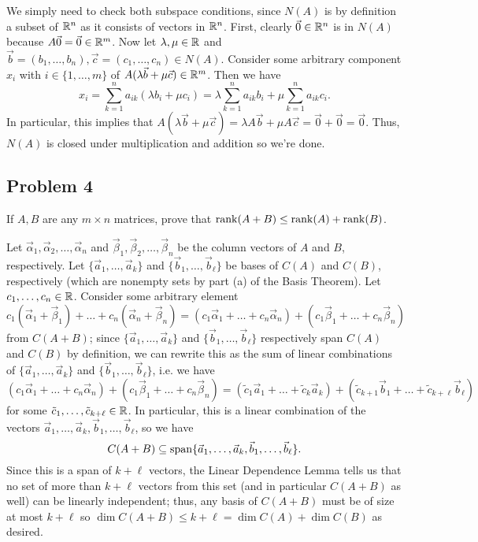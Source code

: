 \documentclass[main.tex]{subfiles}
\begin{document}
\begin{soln}
    We simply need to check both subspace conditions, since $N(A)$ is by definition a subset of $\mathbb R^n$ as it consists of vectors in $\mathbb R^n$. First, clearly $\vec{0}\in \mathbb R^n$ is in $N(A)$ because $A\vec{0} = \vec{0}\in \mathbb R^m$. Now let $\lambda, \mu\in \mathbb R$ and $\vec{b} = (b_1, \ldots , b_n), \vec{c} = (c_1, \ldots , c_n)\in N(A)$. Consider some arbitrary component $x_i$ with $i\in \{1, \ldots , m\}$ of $A(\lambda \vec{b} + \mu\vec{c})\in \mathbb R^m$. Then we have
    \[x_i = \sum_{k = 1}^n a_{ik}(\lambda b_i + \mu c_i) = \lambda\sum_{k = 1}^na_{ik}b_i + \mu\sum_{k = 1}^na_{ik}c_i.\]
    In particular, this implies that $A(\lambda \vec{b} + \mu\vec{c}) = \lambda A\vec{b} + \mu A\vec{c} = \vec{0} + \vec{0} = \vec{0}$. Thus, $N(A)$ is closed under multiplication and addition so we're done.
\end{soln}
\eject

\subsection{Problem 4}
\begin{claim}
    If $A, B$ are any $m \times n$ matrices, prove that $\operatorname{rank}(A + B) \le \operatorname{rank} (A) + \operatorname{rank} (B)$.
\end{claim}

\begin{soln}
    Let $\vec{\alpha}_1, \vec{\alpha}_2, \ldots , \vec{\alpha}_n$ and $\vec{\beta}_1, \vec{\beta}_2, \ldots , \vec{\beta}_n$ be the column vectors of $A$ and $B$, respectively. Let $\{\vec{a}_1, \ldots , \vec{a}_k\}$ and $\{\vec{b}_1, \ldots , \vec{b}_\ell\}$ be bases of $C(A)$ and $C(B)$, respectively (which are nonempty sets by part (a) of the Basis Theorem). Let $c_1, \ldots , c_n\in \mathbb R$. Consider some arbitrary element
    \[c_1(\vec{\alpha}_1 + \vec{\beta}_1) + \ldots + c_n(\vec{\alpha}_n + \vec{\beta}_n) = (c_1\vec{\alpha}_1 + \ldots + c_n\vec{\alpha}_n) + (c_1\vec{\beta}_1 + \ldots + c_n\vec{\beta}_n)\]
    from $C(A + B)$; since $\{\vec{a}_1, \ldots , \vec{a}_k\}$ and $\{\vec{b}_1, \ldots , \vec{b}_\ell\}$ respectively span $C(A)$ and $C(B)$ by definition, we can rewrite this as the sum of linear combinations of $\{\vec{a}_1, \ldots , \vec{a}_k\}$ and $\{\vec{b}_1, \ldots , \vec{b}_\ell\}$, i.e. we have \[(c_1\vec{\alpha}_1 + \ldots + c_n\vec{\alpha}_n) + (c_1\vec{\beta}_1 + \ldots + c_n\vec{\beta}_n) = (\tilde{c}_1\vec{a}_1 + \ldots + \tilde{c}_k\vec{a}_k) + (\tilde{c}_{k + 1}\vec{b}_1 + \ldots + \tilde{c}_{k + \ell}\vec{b}_\ell)\]
    for some $\tilde{c}_1, \ldots , \tilde{c}_{k + \ell}\in \mathbb R$. In particular, this is a linear combination of the vectors $\vec{a}_1, \ldots , \vec{a}_k, \vec{b}_1, \ldots ,\vec{b}_\ell$, so we have
    \[C(A + B) \subseteq \operatorname{span}\{\vec{a}_1, \ldots , \vec{a}_k, \vec{b}_1, \ldots , \vec{b}_\ell\}.\]
    Since this is a span of $k + \ell$ vectors, the Linear Dependence Lemma tells us that no set of more than $k + \ell$ vectors from this set (and in particular $C(A + B)$ as well) can be linearly independent; thus, any basis of $C(A + B)$ must be of size at most $k + \ell$ so $\dim C(A + B)\le k + \ell = \dim C(A) + \dim C(B)$ as desired.
\end{soln}
\eject
\end{document}
